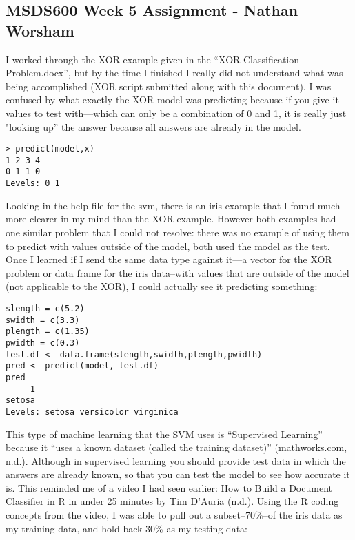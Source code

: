 \documentclass[10pt]{article}
\begin{document}
\subsection*{MSDS600 Week 5 Assignment - Nathan Worsham}
I worked through the XOR example given in the “XOR Classification Problem.docx”, but by the time I finished I really did not understand what was being accomplished (XOR script submitted along with this document). I was confused by what exactly the XOR model was predicting because if you give it values to test with—which can only be a combination of 0 and 1, it is really just "looking up” the answer because all answers are already in the model. 
\begin{verbatim}
> predict(model,x)
1 2 3 4 
0 1 1 0 
Levels: 0 1
\end{verbatim}
Looking in the help file for the svm, there is an iris example that I found much more clearer in my mind than the XOR example. However both examples had one similar problem that I could not resolve: there was no example of using them to predict with values outside of the model, both used the model as the test. Once I learned if I send the same data type against it—a vector for the XOR problem or data frame for the iris data--with values that are outside of the model (not applicable to the XOR), I could actually see it predicting something:
\begin{verbatim}
slength = c(5.2)
swidth = c(3.3)
plength = c(1.35)
pwidth = c(0.3)
test.df <- data.frame(slength,swidth,plength,pwidth)
pred <- predict(model, test.df)
pred
     1
setosa
Levels: setosa versicolor virginica
\end{verbatim}

This type of machine learning that the SVM uses is “Supervised Learning” because it “uses a known dataset (called the training dataset)” (mathworks.com, n.d.). Although in supervised learning you should provide test data in which the answers are already known, so that you can test the model to see how accurate it is. This reminded me of a video I had seen earlier: How to Build a Document Classifier in R in under 25 minutes by Tim D'Auria (n.d.). Using the R coding concepts from the video, I was able to pull out a subset--70\%--of the iris data as my training data, and hold back 30\% as my testing data: 
\end{document}
